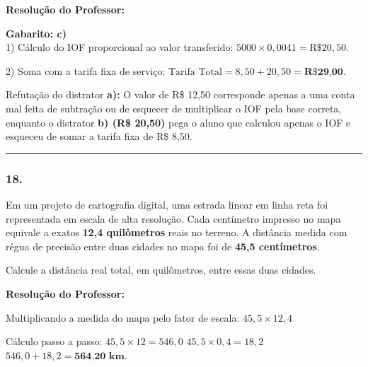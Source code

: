 \begin{multicols*}{2}
\ifgabarito
    \begin{tcolorbox}[colback=CorTitUm!5, colframe=CorTitUm, boxrule=1pt, arc=4pt, left=6pt, right=6pt, top=6pt, bottom=6pt]
    \small\textbf{\textcolor{CorTitUm}{Resolução do Professor:}}\par\vspace{0.1cm}
    \color{CinzaEscuro}
    \textbf{Gabarito: c)}\\
    1) Cálculo do IOF proporcional ao valor transferido:
    $5000 \times 0,0041 = \text{R\$} 20,50$.
    
    2) Soma com a tarifa fixa de serviço:
    $\text{Tarifa Total} = 8,50 + 20,50 = \textbf{R\$ 29,00}$.
    
    Refutação do distrator \textbf{a):} O valor de R\$ 12,50 corresponde apenas a uma conta mal feita de subtração ou de esquecer de multiplicar o IOF pela base correta, enquanto o distrator \textbf{b) (R\$ 20,50)} pega o aluno que calculou apenas o IOF e esqueceu de somar a tarifa fixa de R\$ 8,50.
    \end{tcolorbox}
\fi

\par\vspace{\espacoQuestao}

\noindent\textcolor{CorLinha}{\rule{\linewidth}{0.5pt}} 
\par\vspace{\espacoPreQuestao}
\subsubsection*{18.} Em um projeto de cartografia digital, uma estrada linear em linha reta foi representada em escala de alta resolução. Cada centímetro impresso no mapa equivale a exatos \textbf{12,4 quilômetros} reais no terreno. A distância medida com régua de precisão entre duas cidades no mapa foi de \textbf{45,5 centímetros}.

Calcule a distância real total, em quilômetros, entre essas duas cidades.

\ifgabarito
    \begin{tcolorbox}[colback=CorTitUm!5, colframe=CorTitUm, boxrule=1pt, arc=4pt, left=6pt, right=6pt, top=6pt, bottom=6pt]
    \small\textbf{\textcolor{CorTitUm}{Resolução do Professor:}}\par\vspace{0.1cm}
    \color{CinzaEscuro}
    Multiplicando a medida do mapa pelo fator de escala:
    $45,5 \times 12,4$
    
    Cálculo passo a passo:
    $45,5 \times 12 = 546,0$
    $45,5 \times 0,4 = 18,2$
    $546,0 + 18,2 = \textbf{564,20 km}$.
    

\end{tcolorbox}
\end{multicols*}
